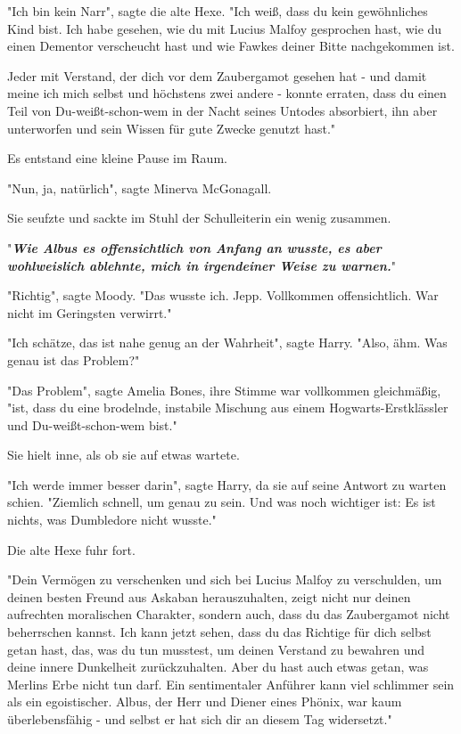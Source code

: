 {"Ich bin kein Narr", sagte die alte Hexe. "Ich weiß, dass du kein gewöhnliches Kind bist. Ich habe gesehen, wie du mit Lucius Malfoy gesprochen hast, wie du einen Dementor verscheucht hast und wie Fawkes deiner Bitte nachgekommen ist.

Jeder mit Verstand, der dich vor dem Zaubergamot gesehen hat - und damit meine ich mich selbst und höchstens zwei andere - konnte erraten, dass du einen Teil von Du-weißt-schon-wem in der Nacht seines Untodes absorbiert, ihn aber unterworfen und sein Wissen für gute Zwecke genutzt hast."

Es entstand eine kleine Pause im Raum.

"Nun, ja, natürlich", sagte Minerva McGonagall.

Sie seufzte und sackte im Stuhl der Schulleiterin ein wenig zusammen.

"\textbf{\emph{Wie Albus es offensichtlich von Anfang an wusste, es aber wohlweislich ablehnte, mich in irgendeiner Weise zu warnen.}}"

"Richtig", sagte Moody. "Das wusste ich. Jepp. Vollkommen offensichtlich. War nicht im Geringsten verwirrt."

"Ich schätze, das ist nahe genug an der Wahrheit", sagte Harry. "Also, ähm. Was genau ist das Problem?"

"Das Problem", sagte Amelia Bones, ihre Stimme war vollkommen gleichmäßig, "ist, dass du eine brodelnde, instabile Mischung aus einem Hogwarts-Erstklässler und Du-weißt-schon-wem bist."

Sie hielt inne, als ob sie auf etwas wartete.

"Ich werde immer besser darin", sagte Harry, da sie auf seine Antwort zu warten schien. "Ziemlich schnell, um genau zu sein. Und was noch wichtiger ist: Es ist nichts, was Dumbledore nicht wusste."

Die alte Hexe fuhr fort.

"Dein Vermögen zu verschenken und sich bei Lucius Malfoy zu verschulden, um deinen besten Freund aus Askaban herauszuhalten, zeigt nicht nur deinen aufrechten moralischen Charakter, sondern auch, dass du das Zaubergamot nicht beherrschen kannst. Ich kann jetzt sehen, dass du das Richtige für dich selbst getan hast, das, was du tun musstest, um deinen Verstand zu bewahren und deine innere Dunkelheit zurückzuhalten. Aber du hast auch etwas getan, was Merlins Erbe nicht tun darf. Ein sentimentaler Anführer kann viel schlimmer sein als ein egoistischer. Albus, der Herr und Diener eines Phönix, war kaum überlebensfähig - und selbst er hat sich dir an diesem Tag widersetzt."

}
